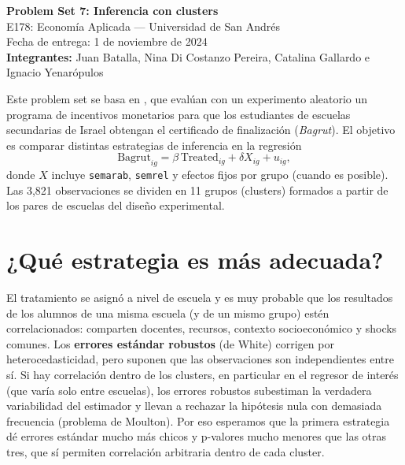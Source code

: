 \documentclass[11pt,a4paper]{article}
\begin{document}
\begin{center}
{\Large\bfseries Problem Set 7: Inferencia con clusters}\\[0.5em]
E178: Economía Aplicada --- Universidad de San Andrés\\
Fecha de entrega: 1 de noviembre de 2024\\[0.5em]
\textbf{Integrantes:} Juan Batalla, Nina Di Costanzo Pereira, Catalina Gallardo e Ignacio Yenarópulos
\end{center}

Este problem set se basa en \citet{angrist}, que evalúan con un experimento aleatorio un programa de incentivos monetarios para que los estudiantes de escuelas secundarias de Israel obtengan el certificado de finalización (\textit{Bagrut}). El objetivo es comparar distintas estrategias de inferencia en la regresión
\[
\text{Bagrut}_{ig}=\beta\,\text{Treated}_{ig}+\delta X_{ig}+u_{ig},
\]
donde $X$ incluye \texttt{semarab}, \texttt{semrel} y efectos fijos por grupo (cuando es posible). Las 3,821 observaciones se dividen en 11 grupos (clusters) formados a partir de los pares de escuelas del diseño experimental.

\section*{¿Qué estrategia es más adecuada?}

El tratamiento se asignó a nivel de escuela y es muy probable que los resultados de los alumnos de una misma escuela (y de un mismo grupo) estén correlacionados: comparten docentes, recursos, contexto socioeconómico y shocks comunes. Los \textbf{errores estándar robustos} (de White) corrigen por heterocedasticidad, pero suponen que las observaciones son independientes entre sí. Si hay correlación dentro de los clusters, en particular en el regresor de interés (que varía solo entre escuelas), los errores robustos subestiman la verdadera variabilidad del estimador y llevan a rechazar la hipótesis nula con demasiada frecuencia (problema de Moulton). Por eso esperamos que la primera estrategia dé errores estándar mucho más chicos y p-valores mucho menores que las otras tres, que sí permiten correlación arbitraria dentro de cada cluster.
\end{document}
